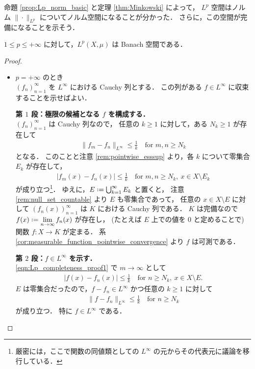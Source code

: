 命題 \ref{prop:Lp_norm_basic} と定理 \ref{thm:Minkowski} によって，
$L^p$ 空間はノルム $\|\cdot\|_{L^p}$ についてノルム空間になることが分かった．
さらに，この空間が完備になることを示そう．

\begin{theorem}
    $1\le p\le+\infty$ に対して，$L^p(X,\mu)$ は Banach 空間である．
\end{theorem}

\begin{proof}
    \leavevmode
    \begin{itemize}[leftmargin=\parindent]
    \item $p=+\infty$ のとき\\
        $(f_n)_{n=1}^\infty$ を $L^\infty$ における Cauchy 列とする．
        この列がある $f\in L^\infty$ に収束することを示せばよい．

        \textbf{第 $1$ 段：極限の候補となる $f$ を構成する．}\\
        $(f_n)_{n=1}^\infty$ は Cauchy 列なので，
        任意の $k\ge1$ に対して，ある $N_k\ge1$ が存在して
        \begin{align*}
            \|f_m-f_n\|_{L^\infty}\le\frac{1}{k}\quad\text{for $m,n\ge N_k$}
        \end{align*}
        となる．
        このことと注意 \ref{rem:pointwise_esssup} より，各 $k$ について零集合 $E_k$ が存在して，
        \begin{align}
            |f_m(x)-f_n(x)|\le\frac{1}{k}\quad\text{for $m,n\ge N_k,\ x\in X\setminus E_k$}
            \label{eqn:Lp_completeness_proof1}
        \end{align}
        が成り立つ\footnote{厳密には，ここで関数の同値類としての $L^\infty$ の元からその代表元に議論を移行している．}．
        ゆえに，$E\defeq\bigcup_{k=1}^\infty E_k$ と置くと，
        注意 \ref{rem:null_set_countable} より $E$ も零集合であって，
        任意の $x\in X\setminus E$ に対して $(f_n(x))_{n=1}^\infty$ は $K$ における Cauchy 列である．
        $K$ は完備なので $\displaystyle f(x)\defeq\lim_{n\to\infty}f_n(x)$ が存在し，
        (たとえば $E$ 上での値を $0$ と定めることで) 関数 $f:X\to K$ が定まる．
        系 \ref{cor:measurable_function_pointwise_convergence} より $f$ は可測である．

        \textbf{第 $2$ 段：$f\in L^\infty$ を示す．}\\
        \eqref{eqn:Lp_completeness_proof1} で $m\to\infty$ として
        \begin{align*}
            |f(x)-f_n(x)|\le\frac{1}{k}\quad\text{for $n\ge N_k,\ x\in X\setminus E$}.
        \end{align*}
        $E$ は零集合だったので，$f-f_n\in L^\infty$ かつ任意の $k\ge1$ に対して
        \begin{align}
            \|f-f_n\|_{L^\infty}\le\frac{1}{k}\quad\text{for $n\ge N_k$}
            \label{eqn:Lp_completeness_proof2}
        \end{align}
        が成り立つ．
        特に $f\in L^\infty$ である．


\end{itemize}
\end{proof}
